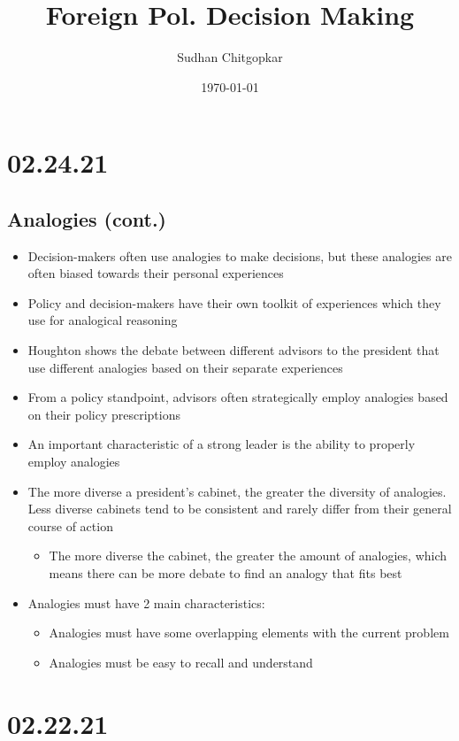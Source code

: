 \documentclass[11pt]{article}
\author{Sudhan Chitgopkar}
\date{\today}
\title{Foreign Pol. Decision Making}
\begin{document}
\maketitle
\section*{02.24.21}
\label{sec:orgba7d921}
\subsection*{Analogies (cont.)}
\label{sec:org2571200}
\begin{itemize}
\item Decision-makers often use analogies to make decisions, but these analogies are often biased towards their personal experiences
\item Policy and decision-makers have their own toolkit of experiences which they use for analogical reasoning
\item Houghton shows the debate between different advisors to the president that use different analogies based on their separate experiences
\item From a policy standpoint, advisors often strategically employ analogies based on their policy prescriptions
\item An important characteristic of a strong leader is the ability to properly employ analogies
\item The more diverse a president's cabinet, the greater the diversity of analogies. Less diverse cabinets tend to be consistent and rarely differ from their general course of action
\begin{itemize}
\item The more diverse the cabinet, the greater the amount of analogies, which means there can be more debate to find an analogy that fits best
\end{itemize}
\item Analogies must have 2 main characteristics:
\begin{itemize}
\item Analogies must have some overlapping elements with the current problem
\item Analogies must be easy to recall and understand
\end{itemize}
\end{itemize}
\section*{02.22.21}
\label{sec:orgf709a87}
\end{document}
